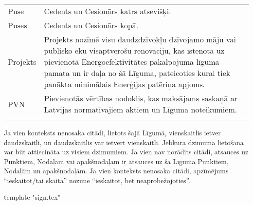 \documentclass[a4paper]{article}
\begin{document}
\begin{longtabu}{|X|X[2]|}
   \hline

  Puse & Cedents un Cesionārs katrs atsevišķi.\\\tabucline{}

   \hline

   Puses & Cedents un Cesionārs kopā.\\\tabucline{}

   \hline

   Projekts & Projekts nozīmē visu daudzdzīvokļu dzīvojamo māju vai publisko ēku visaptverošu renovāciju, kas īstenota uz pievienotā
Energoefektivitātes pakalpojuma līguma pamata un ir daļa no šā Līguma, pateicoties kurai tiek panākta minimālais
Enerģijas patēriņa apjoms.\\\tabucline{}

   \hline

   PVN & Pievienotās vērtības nodoklis, kas maksājams saskaņā ar Latvijas normatīvajiem aktiem un Līguma noteikumiem.\\\tabucline{}

 \end{longtabu}

 \vspace{5mm}

 Ja vien konteksts nenosaka citādi, lietots šajā Līgumā, vienskaitlis ietver daudzskaitli, un daudzskaitlis var ietvert vienskaitli. Jebkura dzimuma lietošana var būt
attiecināta uz visiem dzimumiem. Ja vien nav norādīts citādi, atsauces uz Punktiem, Nodaļām vai apakšnodaļām ir atsauces uz šā Līguma Punktiem, Nodaļām un
apakšnodaļām. Ja vien konteksts nenosaka citādi, apzīmējums “ieskaitot/tai skaitā” nozīmē “ieskaitot, bet neaprobežojoties”. \par

\vspace{5mm}

{{ template "sign.tex"}}
\end{document}

